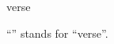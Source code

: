 \documentclass{stex}
\begin{document}
\begin{smodule}{verse}
\begin{sparagraph}[style=symdoc]
``'' stands for ``verse''.
\end{sparagraph}
\end{smodule}
\end{document}

